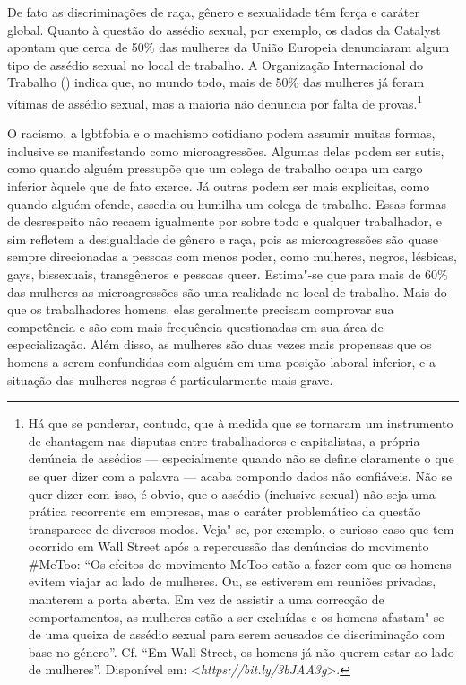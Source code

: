 De fato as discriminações de raça, gênero e sexualidade têm força e
caráter global. Quanto à questão do assédio sexual, por exemplo, os
dados da  Catalyst apontam que cerca de 50\% das mulheres da União
Europeia denunciaram algum tipo de assédio sexual no local de trabalho.
A Organização Internacional do Trabalho () indica que, no mundo todo,
mais de 50\% das mulheres já foram vítimas de assédio sexual, mas a
maioria não denuncia por falta de provas.\footnote{Há que se ponderar,
  contudo, que à medida que se tornaram um instrumento de chantagem nas
  disputas entre trabalhadores e capitalistas, a própria denúncia de
  assédios --- especialmente quando não se define claramente o que se
  quer dizer com a palavra --- acaba compondo dados não confiáveis. Não
  se quer dizer com isso, é obvio, que o assédio (inclusive sexual) não
  seja uma prática recorrente em empresas, mas o caráter problemático da
  questão transparece de diversos modos. Veja"-se, por exemplo, o curioso
  caso que tem ocorrido em Wall Street após a repercussão das denúncias
  do movimento \#MeToo: ``Os efeitos do movimento MeToo estão a fazer
  com que os homens evitem viajar ao lado de mulheres. Ou, se estiverem
  em reuniões privadas, manterem a porta aberta. Em vez de assistir a
  uma correcção de comportamentos, as mulheres estão a ser excluídas e
  os homens afastam"-se de uma queixa de assédio sexual para serem
  acusados de discriminação com base no género''. Cf. ``Em Wall Street,
  os homens já não querem estar ao lado de mulheres''. Disponível em:
  \textless{}\emph{https://bit.ly/3bJAA3g}\textgreater{}.}

O racismo, a lgbtfobia e o machismo cotidiano podem assumir muitas
formas, inclusive se manifestando como microagressões. Algumas delas
podem ser sutis, como quando alguém pressupõe que um colega de trabalho
ocupa um cargo inferior àquele que de fato exerce. Já outras podem ser
mais explícitas, como quando alguém ofende, assedia ou humilha um colega
de trabalho. Essas formas de desrespeito não recaem igualmente por sobre
todo e qualquer trabalhador, e sim refletem a desigualdade de gênero e
raça, pois as microagressões são quase sempre direcionadas a pessoas com
menos poder, como mulheres, negros, lésbicas, gays, bissexuais,
transgêneros e pessoas queer. Estima"-se que para mais de 60\% das
mulheres as microagressões são uma realidade no local de trabalho. Mais
do que os trabalhadores homens, elas geralmente precisam comprovar sua
competência e são com mais frequência questionadas em sua área de
especialização. Além disso, as mulheres são duas vezes mais propensas
que os homens a serem confundidas com alguém em uma posição laboral
inferior, e a situação das mulheres negras é particularmente mais grave.

